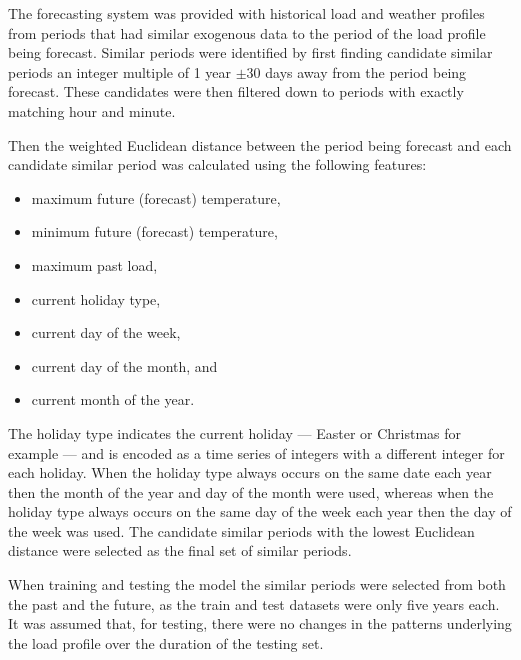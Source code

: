 The forecasting system was provided with historical load and weather profiles from periods that had similar exogenous data to the period of the load profile being forecast.
Similar periods were identified by first finding candidate similar periods an integer multiple of 1 year $\pm$30 days away from the period being forecast.
These candidates were then filtered down to periods with exactly matching hour and minute.

Then the weighted Euclidean distance between the period being forecast and each candidate similar period was calculated using the following features: 
\begin{itemize}
	\item maximum future (forecast) temperature, 
	\item minimum future (forecast) temperature,
	\item maximum past load,
	\item current holiday type, 
	\item current day of the week,
	\item current day of the month, and
	\item current month of the year.
\end{itemize}

The holiday type indicates the current holiday --- Easter or Christmas for example --- and is encoded as a time series of integers with a different integer for each holiday.
When the holiday type always occurs on the same date each year then the month of the year and day of the month were used, whereas when the holiday type always occurs on the same day of the week each year then the day of the week was used.
The candidate similar periods with the lowest Euclidean distance were selected as the final set of similar periods.

When training and testing the model the similar periods were selected from both the past and the future, as the train and test datasets were only five years each.
It was assumed that, for testing, there were no changes in the patterns underlying the load profile over the duration of the testing set.